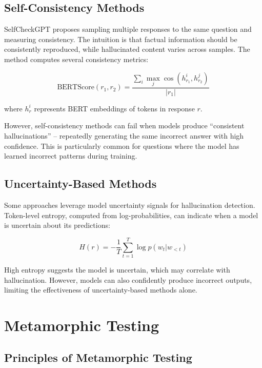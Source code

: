 \subsection{Self-Consistency Methods}

SelfCheckGPT \cite{manakul2023selfcheckgpt} proposes sampling multiple responses to the same question and measuring consistency. The intuition is that factual information should be consistently reproduced, while hallucinated content varies across samples. The method computes several consistency metrics:

\begin{equation}
    \text{BERTScore}(r_1, r_2) = \frac{\sum_{i} \max_j \cos(h_{r_1}^i, h_{r_2}^j)}{|r_1|}
\end{equation}

where $h_{r}^i$ represents BERT embeddings of tokens in response $r$.

However, self-consistency methods can fail when models produce ``consistent hallucinations'' -- repeatedly generating the same incorrect answer with high confidence. This is particularly common for questions where the model has learned incorrect patterns during training.

\subsection{Uncertainty-Based Methods}

Some approaches leverage model uncertainty signals for hallucination detection. Token-level entropy, computed from log-probabilities, can indicate when a model is uncertain about its predictions:

\begin{equation}
    H(r) = -\frac{1}{T} \sum_{t=1}^{T} \log p(w_t | w_{<t})
\end{equation}

High entropy suggests the model is uncertain, which may correlate with hallucination. However, models can also confidently produce incorrect outputs, limiting the effectiveness of uncertainty-based methods alone.

\section{Metamorphic Testing}

\subsection{Principles of Metamorphic Testing}

